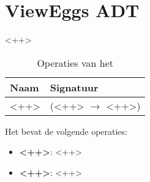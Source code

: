 \section{View\textunderscore Eggs ADT}
\label{section:view_eggs}

<++>

\begin{table}[hbt]
\centering
\begin{tabular}{|ll|}
\hline
\rowcolor[HTML]{000000} 
{\color[HTML]{FFFFFF} \textbf{Naam}} & {\color[HTML]{FFFFFF} \textbf{Signatuur}} \\ \hline
<++>                                 & (<++> $\rightarrow$ <++>)                                       \\ \hline
\end{tabular}
\caption{Operaties van het \texttt{}}
\label{table:view_eggs}
\end{table}

Het \texttt{} bevat de volgende operaties:

\begin{itemize}
	\item \textbf{<++>}: <++>
	\item \textbf{<++>}: <++>
\end{itemize}

